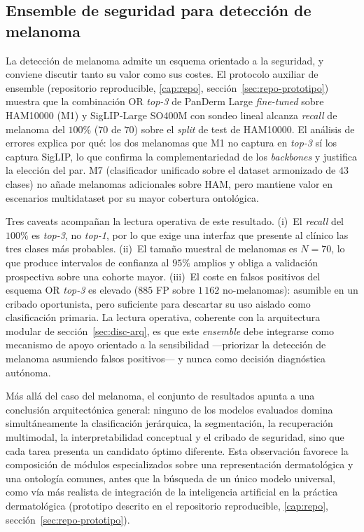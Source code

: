 \subsection{Ensemble de seguridad para detección de melanoma}
\label{sec:disc-ventana}
\label{sec:disc-ensemble}

La detección de melanoma admite un esquema orientado a la seguridad,
y conviene discutir tanto su valor como sus costes. El protocolo
auxiliar de ensemble (repositorio reproducible, \ref{cap:repo},
sección~\ref{sec:repo-prototipo}) muestra que la combinación OR
\emph{top-3} de PanDerm Large \emph{fine-tuned} sobre HAM10000 (M1)
y SigLIP-Large SO400M con sondeo lineal alcanza \emph{recall} de
melanoma del $100\%$ ($70$ de $70$) sobre el \emph{split} de
test de HAM10000. El análisis de errores explica por qué: los dos
melanomas que M1 no captura en \emph{top-3} sí los captura SigLIP,
lo que confirma la complementariedad de los \emph{backbones} y
justifica la elección del par. M7 (clasificador unificado sobre el
dataset armonizado de $43$ clases) no añade melanomas adicionales
sobre HAM, pero mantiene valor en escenarios multidataset por su
mayor cobertura ontológica.

Tres caveats acompañan la lectura operativa de este resultado.
(i)~El \emph{recall} del $100\%$ es \emph{top-3}, no
\emph{top-1}, por lo que exige una interfaz que presente al clínico
las tres clases más probables. (ii)~El tamaño muestral de melanomas
es $N = 70$, lo que produce intervalos de confianza al $95\%$
amplios y obliga a validación prospectiva sobre una cohorte mayor.
(iii)~El coste en falsos positivos del esquema OR \emph{top-3} es
elevado ($885$ FP sobre $1\,162$ no-melanomas): asumible en un
cribado oportunista, pero suficiente para descartar su uso aislado
como clasificación primaria. La lectura operativa, coherente con la
arquitectura modular de sección~\ref{sec:disc-arq}, es que este
\emph{ensemble} debe integrarse como mecanismo de apoyo orientado a la
sensibilidad ---priorizar la detección de melanoma asumiendo falsos
positivos--- y nunca como decisión diagnóstica autónoma.

Más allá del caso del melanoma, el conjunto de resultados apunta a una
conclusión arquitectónica general: ninguno de los modelos evaluados
domina simultáneamente la clasificación jerárquica, la segmentación, la
recuperación multimodal, la interpretabilidad conceptual y el cribado de
seguridad, sino que cada tarea presenta un candidato óptimo diferente.
Esta observación favorece la composición de módulos especializados sobre
una representación dermatológica y una ontología comunes, antes que la
búsqueda de un único modelo universal, como vía más realista de
integración de la inteligencia artificial en la práctica dermatológica
(prototipo descrito en el repositorio reproducible, \ref{cap:repo},
sección~\ref{sec:repo-prototipo}).

